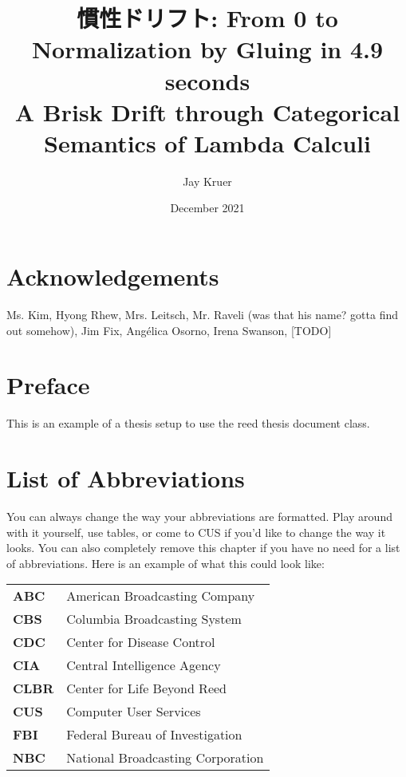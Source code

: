 \documentclass[12pt,twoside]{reedthesis}
\title{慣性ドリフト: From 0 to Normalization by Gluing in 4.9 seconds\\ A Brisk Drift through Categorical Semantics of Lambda Calculi}
\author{Jay Kruer}
\date{December 2021}
\theoremstyle{definition}
\theoremstyle{remark}
\theoremstyle{theorem}
\begin{document}
\maketitle
\frontmatter %
\pagestyle{empty} %

\chapter*{Acknowledgements}
Ms. Kim, Hyong Rhew, Mrs. Leitsch, Mr. Raveli (was that his name? gotta find out
somehow), Jim Fix, Ang\'elica Osorno, Irena Swanson, [TODO]

\chapter*{Preface}
This is an example of a thesis setup to use the reed thesis document class.



\chapter*{List of Abbreviations}
You can always change the way your abbreviations are formatted. Play around with it yourself, use tables, or come to CUS if you'd like to change the way it looks. You can also completely remove this chapter if you have no need for a list of abbreviations. Here is an example of what this could look like:

\begin{table}[h]
  \centering %
  \begin{tabular}{ll}
    \textbf{ABC}  	&  American Broadcasting Company \\
    \textbf{CBS}  	&  Columbia Broadcasting System\\
    \textbf{CDC}  	&  Center for Disease Control \\
    \textbf{CIA}  	&  Central Intelligence Agency\\
    \textbf{CLBR} 	&  Center for Life Beyond Reed\\
    \textbf{CUS}  	&  Computer User Services\\
    \textbf{FBI}  	&  Federal Bureau of Investigation\\
    \textbf{NBC}  	&  National Broadcasting Corporation\\
  \end{tabular}
\end{table}
\end{document}
